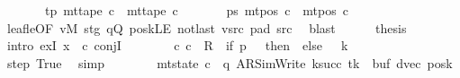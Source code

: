 \begin{isabellebody}
\ \ \ \ \ \ \ tp{\isacharcolon}{\kern0pt}\ {\isachardoublequoteopen}mt{\isacharunderscore}{\kern0pt}tape\ c{\isacharprime}{\kern0pt}{\isacharprime}{\kern0pt}\ {\isacharequal}{\kern0pt}\ mt{\isacharunderscore}{\kern0pt}tape\ c{\isacharprime}{\kern0pt}{\isachardoublequoteclose}\isanewline
\ \ \ \ \ \ \ ps{\isacharcolon}{\kern0pt}\ {\isachardoublequoteopen}mt{\isacharunderscore}{\kern0pt}pos\ c{\isacharprime}{\kern0pt}{\isacharprime}{\kern0pt}\ {\isacharequal}{\kern0pt}\ mt{\isacharunderscore}{\kern0pt}pos\ c{\isacharprime}{\kern0pt}{\isachardoublequoteclose}\isanewline
\ \ \ \ \ \ \isamarkupfalse%
\ leaf{\isacharunderscore}{\kern0pt}le{\isacharbrackleft}{\kern0pt}OF\ vM\ stg\ qQ\ poskLE\ notlast\ vsrc\ pad{}\ src{}{\isacharbrackright}{\kern0pt}\ \isamarkupfalse%
\ blast\isanewline
\ \ \ \ \isamarkupfalse%
\ {\isacharquery}{\kern0pt}thesis\isanewline
\ \ \ \ \isamarkupfalse%
\ {\isacharparenleft}{\kern0pt}intro\ exI{\isacharbrackleft}{\kern0pt}\ x\ {\isacharequal}{\kern0pt}\ c{\isacharprime}{\kern0pt}{\isacharprime}{\kern0pt}{\isacharbrackright}{\kern0pt}\ conjI{\isacharparenright}{\kern0pt}\isanewline
\ \ \ \ \ \ \isamarkupfalse%
\ {\isachardoublequoteopen}{\isacharparenleft}{\kern0pt}c{\isacharprime}{\kern0pt}{\isacharcomma}{\kern0pt}\ c{\isacharprime}{\kern0pt}{\isacharprime}{\kern0pt}{\isacharparenright}{\kern0pt}\ {\isasymin}\ {\isacharquery}{\kern0pt}R\ {\isacharcircum}{\kern0pt}{\isacharcircum}{\kern0pt}\ {\isacharparenleft}{\kern0pt}if\ p\ {\isacharequal}{\kern0pt}\ {}\ then\ {}\ else\ {}\ {\isacharasterisk}{\kern0pt}\ {\isacharquery}{\kern0pt}k{\isacharparenright}{\kern0pt}{\isachardoublequoteclose}\isanewline
\ \ \ \ \ \ \ \ \isamarkupfalse%
\ step\ True\ \isamarkupfalse%
\ simp\isanewline
\ \ \ \ \ \ \isamarkupfalse%
\ {\isachardoublequoteopen}mt{\isacharunderscore}{\kern0pt}state\ c{\isacharprime}{\kern0pt}{\isacharprime}{\kern0pt}\ {\isacharequal}{\kern0pt}\ {\isacharparenleft}{\kern0pt}q{\isacharcomma}{\kern0pt}\ AR{\isacharunderscore}{\kern0pt}SimWrite{\isacharcomma}{\kern0pt}\ k{\isacharunderscore}{\kern0pt}succ\ tk{\isacharcomma}{\kern0pt}\ {}{\isacharcomma}{\kern0pt}\ buf{\isacharcomma}{\kern0pt}\ dvec{\isacharcomma}{\kern0pt}\ posk{\isacharparenright}{\kern0pt}{\isachardoublequoteclose}\isanewline
\ \ \ \ \ \ \ \ \isamarkupfalse%

\end{isabellebody}
